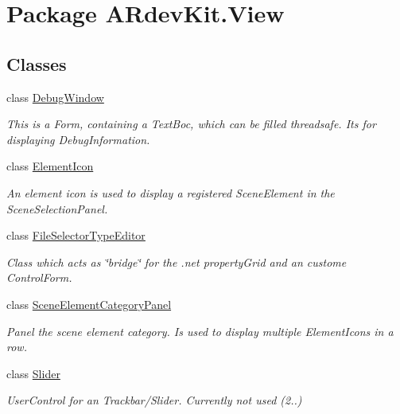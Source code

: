 \hypertarget{namespace_a_rdev_kit_1_1_view}{\section{Package A\-Rdev\-Kit.\-View}
\label{namespace_a_rdev_kit_1_1_view}
}
\subsection*{Classes}
\begin{DoxyCompactItemize}
\item 
class \hyperlink{class_a_rdev_kit_1_1_view_1_1_debug_window}{Debug\-Window}
\begin{DoxyCompactList}\small\item\em This is a Form, containing a Text\-Boc, which can be filled threadsafe. Its for displaying Debug\-Information. \end{DoxyCompactList}\item 
class \hyperlink{class_a_rdev_kit_1_1_view_1_1_element_icon}{Element\-Icon}
\begin{DoxyCompactList}\small\item\em An element icon is used to display a registered Scene\-Element in the Scene\-Selection\-Panel. \end{DoxyCompactList}\item 
class \hyperlink{class_a_rdev_kit_1_1_view_1_1_file_selector_type_editor}{File\-Selector\-Type\-Editor}
\begin{DoxyCompactList}\small\item\em Class which acts as \char`\"{}bridge\char`\"{} for the .net property\-Grid and an custome Control\-Form. \end{DoxyCompactList}\item 
class \hyperlink{class_a_rdev_kit_1_1_view_1_1_scene_element_category_panel}{Scene\-Element\-Category\-Panel}
\begin{DoxyCompactList}\small\item\em Panel the scene element category. Is used to display multiple Element\-Icons in a row. \end{DoxyCompactList}\item 
class \hyperlink{class_a_rdev_kit_1_1_view_1_1_slider}{Slider}
\begin{DoxyCompactList}\small\item\em User\-Control for an Trackbar/\-Slider. Currently not used (2..) \end{DoxyCompactList}\item 

\end{DoxyCompactItemize}

